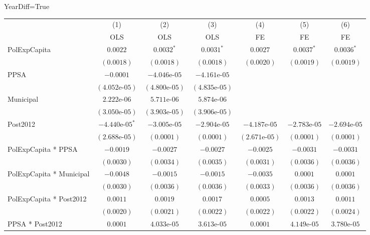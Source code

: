 \documentclass[border=10pt,varwidth=25cm]{standalone}
\renewenvironment{table}[1][]{}{}
\begin{document}
\begin{table}[H]
    \centering
    \scriptsize
    \begin{minipage}{\textwidth}
    \centering
    {\normalsize YearDiff=True}
    \vspace{6pt}
    \begin{tabular}{lcccccc}
        \toprule
         & (1) & (2) & (3) & (4) & (5) & (6) \\
         & OLS & OLS & OLS & FE & FE & FE \\
        \midrule
        PolExpCapita & $0.0022$ & $0.0032^{*}$ & $0.0031^{*}$ & $0.0027$ & $0.0037^{*}$ & $0.0036^{*}$ \\
         & $(0.0018)$ & $(0.0018)$ & $(0.0018)$ & $(0.0020)$ & $(0.0019)$ & $(0.0019)$ \\[4pt]
        PPSA & $-0.0001$ & $-4.046\text{e-}05$ & $-4.161\text{e-}05$ &  &  &  \\
         & $(4.052\text{e-}05)$ & $(4.800\text{e-}05)$ & $(4.835\text{e-}05)$ &  &  &  \\[4pt]
        Municipal & $2.222\text{e-}06$ & $5.711\text{e-}06$ & $5.874\text{e-}06$ &  &  &  \\
         & $(3.050\text{e-}05)$ & $(3.903\text{e-}05)$ & $(3.906\text{e-}05)$ &  &  &  \\[4pt]
        Post2012 & $-4.440\text{e-}05^{*}$ & $-3.005\text{e-}05$ & $-2.904\text{e-}05$ & $-4.187\text{e-}05$ & $-2.783\text{e-}05$ & $-2.694\text{e-}05$ \\
         & $(2.688\text{e-}05)$ & $(0.0001)$ & $(0.0001)$ & $(2.671\text{e-}05)$ & $(0.0001)$ & $(0.0001)$ \\[4pt]
        PolExpCapita * PPSA & $-0.0019$ & $-0.0027$ & $-0.0027$ & $-0.0025$ & $-0.0031$ & $-0.0031$ \\
         & $(0.0030)$ & $(0.0034)$ & $(0.0035)$ & $(0.0031)$ & $(0.0036)$ & $(0.0036)$ \\[4pt]
        PolExpCapita * Municipal & $-0.0048$ & $-0.0015$ & $-0.0015$ & $-0.0035$ & $0.0001$ & $0.0001$ \\
         & $(0.0030)$ & $(0.0036)$ & $(0.0036)$ & $(0.0033)$ & $(0.0036)$ & $(0.0036)$ \\[4pt]
        PolExpCapita * Post2012 & $0.0011$ & $0.0019$ & $0.0017$ & $0.0005$ & $0.0013$ & $0.0011$ \\
         & $(0.0020)$ & $(0.0021)$ & $(0.0022)$ & $(0.0022)$ & $(0.0022)$ & $(0.0024)$ \\[4pt]
        PPSA * Post2012 & $0.0001$ & $4.033\text{e-}05$ & $3.613\text{e-}05$ & $0.0001$ & $4.149\text{e-}05$ & $3.780\text{e-}05$ \\

\end{tabular}
\end{minipage}
\end{table}
\end{document}
